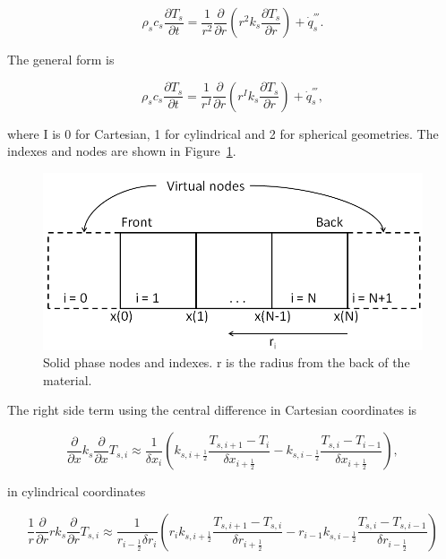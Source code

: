 \begin{equation}
\label{heat_cond_spher}
     \rho_s c_s \frac{\partial T_s}{\partial t} = \frac{1}{r^2}\frac{\partial}{\partial r} (r^2 k_s \frac{\partial T_s}{\partial r}) + \dot{q}^{'''}_s. 
\end{equation}
 
The general form is

\begin{equation}
\label{heat_cond_cyl2}
     \rho_s c_s \frac{\partial T_s}{\partial t} = \frac{1}{r^I}\frac{\partial}{\partial r} (r^I k_s \frac{\partial T_s}{\partial r}) + \dot{q}^{'''}_s, 
\end{equation}

where I is 0 for Cartesian, 1 for cylindrical and 2 for spherical geometries. The indexes and nodes are shown in Figure~\ref{fig_solid_nodes}.

\begin{figure}[ht]
    \centering
    \includegraphics[width=5.0in]{FIGURES/appendix_I_solid_nodes.png}
    \caption{Solid phase nodes and indexes. r is the radius from the back of the material.}
    \label{fig_solid_nodes}
\end{figure}

The right side term using the central difference in Cartesian coordinates is

\begin{equation}
\label{T_cart}
    \frac{\partial}{\partial x} k_s \frac{\partial}{\partial x} T_{s,i} 
    \approx \frac{1}{\delta x_i}(k_{s,i+\frac{1}{2}}\frac{T_{s,i+1}-T_{i}}{\delta x_{i+\frac{1}{2}}}-k_{s, i-\frac{1}{2}}\frac{T_{s,i}-T_{i-1}}{\delta x_{i+\frac{1}{2}}}),
\end{equation}

in cylindrical coordinates

\begin{equation}
\label{T_cyl}
    \frac{1}{r}\frac{\partial}{\partial r} rk_s \frac{\partial}{\partial r} T_{s,i} 
    \approx \frac{1}{r_{i-\frac{1}{2}} \delta r_i}(r_{i}k_{s,i+\frac{1}{2}}\frac{T_{s,i+1}-T_{s,i}}{\delta r_{i+\frac{1}{2}}}-r_{i-1}k_{s,i-\frac{1}{2}}\frac{T_{s,i}-T_{s,i-1}}{\delta r_{i-\frac{1}{2}}})
\end{equation}

